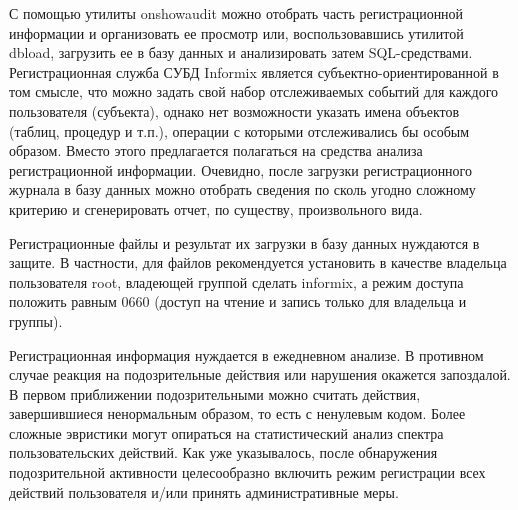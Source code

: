 С помощью утилиты onshowaudit можно отобрать часть регистрационной информации и организовать ее просмотр или, воспользовавшись утилитой dbload, загрузить ее в базу данных и анализировать затем SQL-средствами. Регистрационная служба СУБД Informix является субъектно-ориентированной в том смысле, что можно задать свой набор отслеживаемых событий для каждого пользователя (субъекта), однако нет возможности указать имена объектов (таблиц, процедур и т.п.), операции с которыми отслеживались бы особым образом. Вместо этого предлагается полагаться на средства анализа регистрационной информации. Очевидно, после загрузки регистрационного журнала в базу данных можно отобрать сведения по сколь угодно сложному критерию и сгенерировать отчет, по существу, произвольного вида.

Регистрационные файлы и результат их загрузки в базу данных нуждаются в защите. В частности, для файлов рекомендуется установить в качестве владельца пользователя root, владеющей группой сделать informix, а режим доступа положить равным 0660 (доступ на чтение и запись только для владельца и группы).

Регистрационная информация нуждается в ежедневном анализе. В противном случае реакция на подозрительные действия или нарушения окажется запоздалой. В первом приближении подозрительными можно считать действия, завершившиеся ненормальным образом, то есть с ненулевым кодом. Более сложные эвристики могут опираться на статистический анализ спектра пользовательских действий. Как уже указывалось, после обнаружения подозрительной активности целесообразно включить режим регистрации всех действий пользователя и/или принять административные меры.